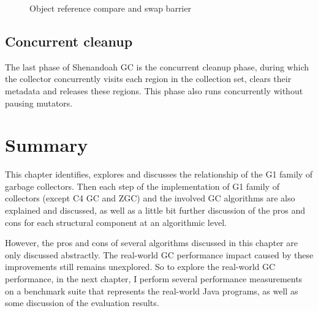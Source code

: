 \begin{figure}
  \centering
  
  \caption{Object reference compare and swap barrier} 
  \label{fig:objectcasbarrier}
\end{figure}

\subsection{Concurrent cleanup}

The last phase of Shenandoah GC is the concurrent cleanup phase, during which the
collector concurrently visits each region in the collection set, clears their metadata
and releases these regions. This phase also runs concurrently without pausing mutators.



\section{Summary}

This chapter identifies, explores and discusses the relationship of the G1 family of garbage collectors.
Then each step of the implementation of G1 family of collectors (except C4 GC and ZGC) and the involved GC algorithms
are also explained and discussed, as well as a little bit further discussion of the
pros and cons for each structural component at an algorithmic level.

However, the pros and cons of several algorithms discussed in this chapter are
only discussed abstractly.
The real-world GC performance impact caused by these improvements still remains unexplored.
So to explore the real-world GC performance, in the next chapter, I perform several performance
measurements on a benchmark suite that represents the real-world Java programs,
as well as some discussion of the evaluation results.


